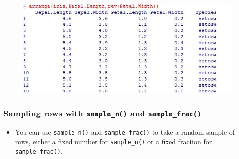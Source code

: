 \documentclass{beamer}
\begin{document}
	\begin{frame}
		\begin{figure}
			\centering
			\includegraphics[width=0.97\linewidth]{images/irisarrange2}
			
		\end{figure}
		
	\end{frame}
	
	
	
	\begin{frame}
		\frametitle{Sampling rows with \texttt{sample\_n()} and \texttt{sample\_frac()}}
		\Large
		\begin{itemize}
			\item You can use \texttt{sample\_n()} and \texttt{sample\_frac()} to take a random sample of rows, either a fixed number for \texttt{sample\_n()} or a fixed fraction for \texttt{sample\_frac()}.
		\end{itemize}
	\end{frame}
	
\end{document}
